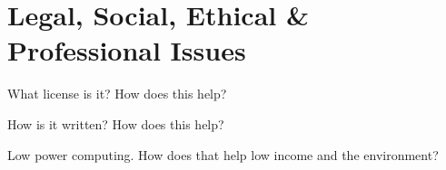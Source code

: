 \chapter{Legal, Social, Ethical \& Professional Issues}


What license is it?
How does this help?

How is it written?
How does this help?

Low power computing.
How does that help low income and the environment?